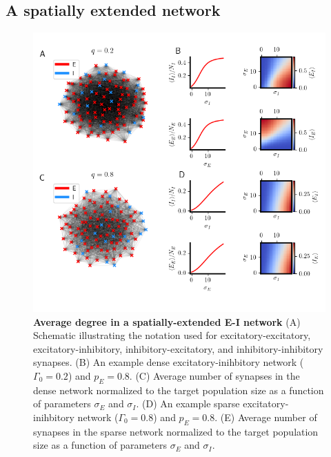 \documentclass{ucetd}
\begin{document}
\subsection{A spatially extended network}


\begin{figure}[t!]
\centering
\includegraphics[width=165mm]{figure-9}
\caption{\textbf{Average degree in a spatially-extended E-I network} (A) Schematic illustrating the notation used for excitatory-excitatory, excitatory-inhibitory, inhibitory-excitatory, and inhibitory-inhibitory synapses. (B) An example dense excitatory-inihbitory network ($\Gamma_{0}=0.2$) and $p_{E} = 0.8$. (C) Average number of synapses in the dense network normalized to the target population size as a function of parameters $\sigma_{E}$ and $\sigma_{I}$. (D) An example sparse excitatory-inihbitory network ($\Gamma_{0}=0.8$) and $p_{E} = 0.8$. (E) Average number of synapses in the sparse network normalized to the target population size as a function of parameters $\sigma_{E}$ and $\sigma_{I}$.}
\end{figure}
\end{document}
